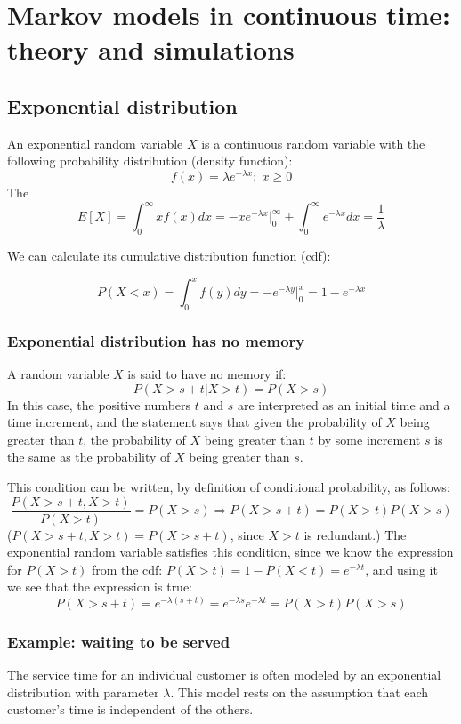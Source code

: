 \documentclass[11pt]{book}
\begin{document}
\setcounter{chapter}{6}
\chapter[Continuous-time Markov models ]{Markov models in continuous time: theory and simulations}


\section{Exponential distribution} 
An exponential random variable $X$ is a continuous random variable with the following probability distribution (density function):
$$ f(x) = \lambda e^{-\lambda x}; \; x \geq 0 $$
The
$$ E[X] = \int_0^\infty x f(x) dx = -x e^{-\lambda x}  |_0^\infty + \int_0^\infty e^{-\lambda x} dx = \frac{1}{\lambda}$$

We can calculate its cumulative distribution function (cdf):

$$ P( X < x) = \int_0^x f(y) dy = -e^{-\lambda y}|_0^x = 1 - e^{-\lambda x} $$

\subsection{Exponential distribution has no memory }
A random variable $X$ is said to have no memory if:
$$ P(X > s + t | X > t ) = P(X > s)$$
In this case, the positive numbers $t$ and $s$ are interpreted as an initial time and a time increment, and the statement says that given the probability of $X$ being greater than  $t$, the probability of $X$ being greater than $t$ by some increment $s$ is the same as the probability of $X$ being greater than $s$.

This condition can be written, by definition of conditional probability, as follows:
$$ \frac{P (X  > s +t , X > t)}{P(X > t)} = P(X > s) \Rightarrow P (X  > s +t ) = P(X > t)P(X > s) $$
($P(X > s +t , X > t) = P (X  > s +t )$, since $X > t$ is redundant.)
The exponential random variable satisfies this condition, since we know the expression for $P(X > t)$ from the cdf: $P(X > t) = 1 - P(X < t) = e^{-\lambda t}$, and using it we see that the expression is true:
$$ P(X > s +t)= e^{-\lambda (s+t)} = e^{-\lambda s}e^{-\lambda t} = P(X > t)P(X > s)$$

\subsection{Example: waiting to be served}
The service time for an individual customer is often modeled by an exponential distribution with parameter $\lambda$. This model rests on the assumption that each customer's time is independent of the others. 
\end{document}

